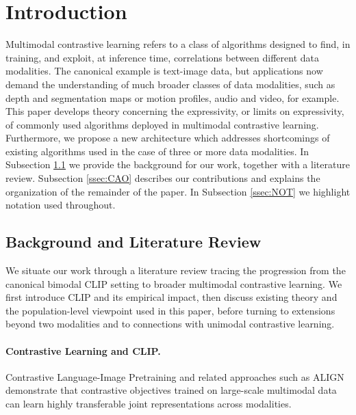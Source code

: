 \documentclass{article}
\begin{document}
\section{Introduction}
Multimodal contrastive learning refers to a class of algorithms designed to
find, in training, and exploit, at inference time, correlations between
different data modalities. The canonical example is text-image data, but
applications now demand the understanding of much broader classes of data
modalities, such as depth and segmentation maps or motion profiles, audio
and video, for example. This paper develops theory concerning the
expressivity, or limits on expressivity, of commonly used algorithms
deployed in multimodal contrastive learning. Furthermore, we propose a
new architecture which addresses shortcomings of
existing algorithms used in the case of three or more data modalities. In
Subsection \ref{ssec:BALR} we provide the background for our work, together
with a literature review. Subsection \ref{ssec:CAO} describes our
contributions and explains the organization of the remainder of the paper.
In Subsection \ref{ssec:NOT} we highlight notation used throughout.



\subsection{Background and Literature Review} \label{ssec:BALR}

We situate our work through a literature review 
tracing the progression from the canonical bimodal CLIP
setting to broader multimodal contrastive learning. We first introduce CLIP and
its empirical impact, then discuss existing theory and the population-level
viewpoint used in this paper, before turning to extensions beyond two
modalities and to connections with unimodal contrastive learning.

\paragraph{Contrastive Learning and CLIP.}
Contrastive Language-Image Pretraining
\citep{radfordLearningTransferableVisual2021} and related approaches such
as ALIGN \citep{jiaScalingVisualVisionLanguage2021} demonstrate that
contrastive objectives trained on large-scale multimodal data can learn
highly transferable joint representations across modalities.
\end{document}

